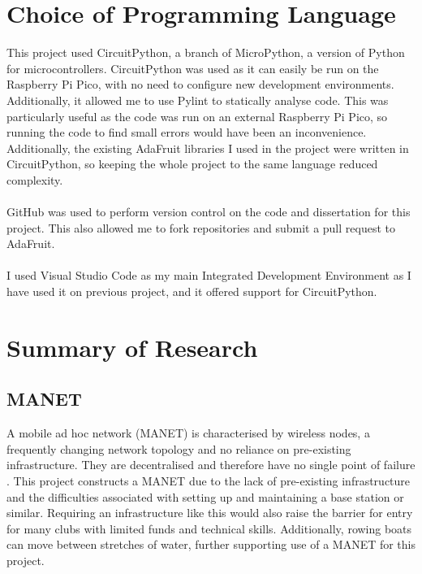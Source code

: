 \documentclass[12pt,a4paper]{report}
\begin{document}
\section{Choice of Programming Language} 
This project used CircuitPython, a branch of MicroPython, a version of Python for microcontrollers. CircuitPython was used as it can easily be run on the Raspberry Pi Pico, with no need to configure new development environments. Additionally, it allowed me to use Pylint to statically analyse code. This was particularly useful as the code was run on an external Raspberry Pi Pico, so running the code to find small errors would have been an inconvenience. Additionally, the existing AdaFruit libraries I used in the project were written in CircuitPython, so keeping the whole project to the same language reduced complexity. \\ \\
GitHub was used to perform version control on the code and dissertation for this project. This also allowed me to fork repositories and submit a pull request to AdaFruit. \\ \\ 
I used Visual Studio Code as my main Integrated Development Environment as I have used it on previous project, and it offered support for CircuitPython.


\section{Summary of Research}
\subsection{MANET}
A mobile ad hoc network (MANET) is characterised by wireless nodes, a frequently changing network topology and no reliance on pre-existing infrastructure. They are decentralised and therefore have no single point of failure \cite{d2}.  This project constructs a MANET due to the lack of pre-existing infrastructure and the difficulties associated with setting up and maintaining a base station or similar. Requiring an infrastructure like this would also raise the barrier for entry for many clubs with limited funds and technical skills. Additionally, rowing boats can move between stretches of water, further supporting use of a MANET for this project.
\end{document}
